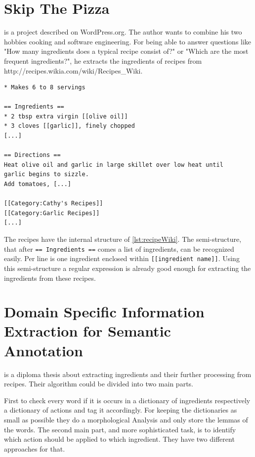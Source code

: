 \documentclass[12pt, twoside]{report}
\begin{document}
\section{Skip The Pizza}
\parencite{REgutGenug} is a project described on WordPress.org. The author wants to combine his two hobbies cooking and software engineering. For being able to answer questions like "How many ingredients does a typical recipe consist of?" or "Which are the most frequent ingredients?", he extracts the ingredients of recipes from http://recipes.wikia.com/wiki/Recipes\_Wiki.

\begin{lstlisting}[frame=single, basicstyle=\footnotesize\ttfamily,caption={Shortened example recipe from \\ http://recipes.wikia.com/wiki/Recipes\_Wiki}, label=lst:recipeWiki]
* Makes 6 to 8 servings

== Ingredients ==
* 2 tbsp extra virgin [[olive oil]]
* 3 cloves [[garlic]], finely chopped
[...]

== Directions ==
Heat olive oil and garlic in large skillet over low heat until
garlic begins to sizzle.
Add tomatoes, [...]

[[Category:Cathy's Recipes]]
[[Category:Garlic Recipes]]
[...]
\end{lstlisting}

The recipes have the internal structure of \cref{lst:recipeWiki}. The semi-structure, that after \texttt{== Ingredients ==} comes a list of ingredients, can be recognized easily. Per line is one ingredient enclosed within \texttt{[[ingredient name]]}. Using this semi-structure a regular expression is already good enough for extracting the ingredients from these recipes.

 
\section{Domain Specific Information Extraction for Semantic Annotation}
\parencite{GrammaBased} is a diploma thesis about extracting ingredients and their further processing from recipes. Their algorithm could be divided into two main parts.

First to check every word if it is occurs in a dictionary of ingredients respectively a dictionary of actions and tag it accordingly. For keeping the dictionaries as small as possible they do a morphological Analysis and only store the lemmas of the words. The second main part, and more sophisticated task, is to identify which action should be applied to which ingredient. They have two different approaches for that.
\end{document}

